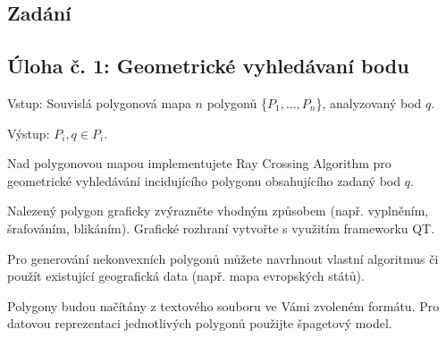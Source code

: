 \documentclass{article}
\begin{document}
\begin{spacing}{1.5}
\section*{Zadání}
\subsection*{\textbf{Úloha č. 1: Geometrické vyhledávaní bodu}}
\noindent Vstup: Souvislá polygonová mapa $n$ polygonů \{$P_1, ..., P_n$\}, analyzovaný bod $q$.

\noindent Výstup: $P_i, q \in P_i$.

\noindent Nad polygonovou mapou implementujete Ray Crossing Algorithm pro geometrické vyhledávání incidujícího polygonu obsahujícího zadaný bod $q$.

\noindent Nalezený polygon graficky zvýrazněte vhodným způsobem (např. vyplněním, šrafováním, blikáním). Grafické rozhraní vytvořte s využitím frameworku QT.

\noindent Pro generování nekonvexních polygonů můžete navrhnout vlastní algoritmus či použít existující geografická data (např. mapa evropských států).

\noindent Polygony budou načítány z textového souboru ve Vámi zvoleném formátu. Pro datovou reprezentaci jednotlivých polygonů použijte špagetový model.

\vspace{1cm}

\end{spacing}
\end{document}
